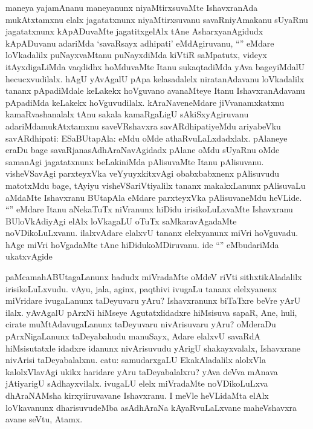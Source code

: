 \begin{artha}
maneya yajamAnanu maneyanunx niyaMtirxsuvaMte IshavxranAda mukAtxtamxnu elalx jagatatxnunx niyaMtirxsuvanu savaRniyAmakanu sUyaRnu jagatatxnunx kApADuvaMte jagatitxgelAlx tAne AsharxyanAgidudx kApADuvanu adariMda `savaRsayx adhipati' eMdAgiruvanu, ``\stext'' eMdare loVkadalilx puNayxvaMtanu puNayxdiMda kiVtiR saMpatutx, videyx itAyxdigaLiMda vaqdidhx hoMduvaMte Itanu sukaqtadiMda yAva bageyiMdalU hecucxvudilalx. hAgU yAvAgalU pApa kelasadalelx niratanAdavanu loVkadalilx tananx pApadiMdale keLakekx hoVguvano avanaMteye Itanu IshavxranAdavanu pApadiMda keLakekx hoVguvudilalx. kAraNaveneMdare jiVvanamxkatxnu kamaRvashanalalx tAnu sakala kamaRgaLigU sAkiSxyAgiruvanu adariMdamukAtxtamxnu saveVRshavxra savARdhipatiyeMdu ariyabeVku savARdhipati: ESaBUtapAla: eMdu oMde athaRvuLaLxdadxlalx. pAlaneye eraDu bage savaRjanasAdhAraNavAgidadx pAlane oMdu sUyaRnu oMde samanAgi jagatatxnunx beLakiniMda pAlisuvaMte Itanu pAlisuvanu. visheVSavAgi parxteyxVka veYyuyxkitxvAgi obabxbabxnenx pAlisuvudu matotxMdu bage, tAyiyu visheVSariVtiyalilx tananx makakxLanunx pAlisuvaLu aMdaMte Ishavxranu BUtapAla eMdare parxteyxVka pAlisuvaneMdu heVLide. ``\stext'' eMdare Itanu aNekaTuTx niVranunx hiDidu irisikoLuLxvaMte Ishavxranu BUloVkAdiyAgi elAlx loVkagaLU oTuTx saMkaravAgadaMte noVDikoLuLxvanu. ilalxvAdare elalxvU tananx elelxyanunx miVri hoVguvadu. hAge miVri hoVgadaMte tAne hiDidukoMDiruvanu. ide ``\stext'' eMbudariMda ukatxvAgide
\end{artha}


\begin{artha}
paMcamahABUtagaLanunx hadudx miVradaMte oMdeV riVti sithxtikAladalilx irisikoLuLxvudu. vAyu, jala, aginx, paqthivi ivugaLu tananx elelxyanenx miVridare ivugaLanunx taDeyuvaru yAru? Ishavxranunx biTaTxre beVre yArU ilalx. yAvAgalU pArxNi hiMseye Agutatxlidadxre hiMsisuva sapaR, Ane, huli, cirate muMtAdavugaLanunx taDeyuvaru nivArisuvaru yAru? oMderaDu pArxNigaLanunx taDeyabahudu manuSayx, Adare elalxvU savaRdA hiMsisutatxle idadxre idanunx nivArisuvudu yArigU shakayxvalalx, Ishavxrane nivArisi taDeyabalalxnu. catu: samudarxgaLU EkakAladalilx alolxVla kalolxVlavAgi ukikx haridare yAru taDeyabalalxru? yAva deVva mAnava jAtiyarigU sAdhayxvilalx. ivugaLU elelx miVradaMte noVDikoLuLxva dhAraNAMsha kirxyiiruvavane Ishavxranu. I meVle heVLidaMta elAlx loVkavanunx dharisuvudeMba asAdhAraNa kAyaRvuLaLxvane maheVshavxra avane seVtu, Atamx.
\end{artha}

